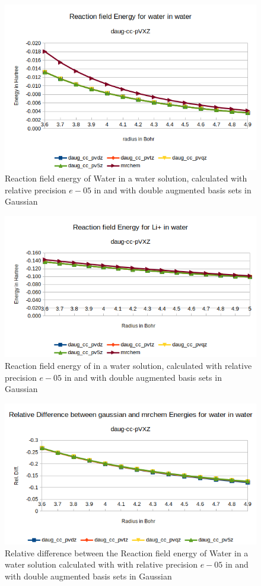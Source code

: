 \documentclass[../master_thesis.tex]{subfiles}
\begin{document}
\begin{figure}[!htb]
  \centering
    \includegraphics[width=0.75\linewidth]{img/Erdaugwat.png}
  \caption{Reaction field energy of Water in a water solution, calculated with relative precision $e-05$ in \mrchem and with double augmented basis sets in Gaussian}
  \label{fig:watEnergyplotsdaug}
\end{figure}

\begin{figure}[!htb]
  \centering
    \includegraphics[width=0.75\linewidth]{img/Erdauglip.png}
  \caption{Reaction field energy of  in a water solution, calculated with relative precision $e-05$ in \mrchem  and with double augmented basis sets in Gaussian}
  \label{fig:lipEnergyplotsdaug}
\end{figure}



\begin{figure}[!htb]
  \centering
    \includegraphics[width=\linewidth]{img/watdaugreldiff.png}
  \caption{Relative difference between the Reaction field energy of Water in a water solution calculated with with relative precision $e-05$ in \mrchem
   and with double augmented basis sets in Gaussian}
  \label{fig:watreldiffdaug}
\end{figure}
\end{document}
